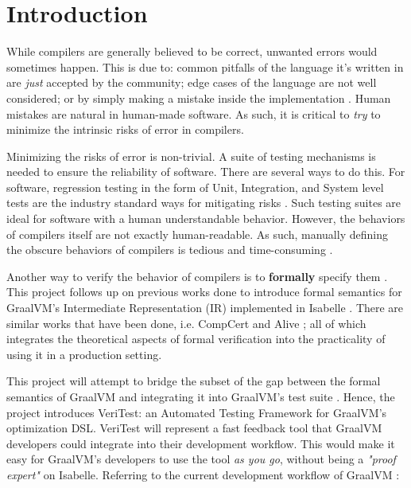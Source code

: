 \setcounter{page}{1}
\section{Introduction}

While compilers are generally believed to be correct, unwanted errors would sometimes happen. This is due to: common pitfalls of the 
language it's written in are \emph{just} accepted by the community; edge cases of the language are not well considered; or by simply making a 
mistake inside the implementation \cite[Sec. 1.2]{CompilerOptimization}. Human mistakes are natural in human-made software. As such, it is 
critical to \emph{try} to minimize the intrinsic risks of error in compilers.

Minimizing the risks of error is non-trivial. A suite of testing mechanisms is needed to ensure the reliability of software. 
There are several ways to do this. For software, regression testing in the form of Unit, Integration, and System level tests are the 
industry standard ways for mitigating risks \cite{testing}. Such testing suites are ideal for software with a human understandable behavior. However, 
the behaviors of compilers itself are not exactly human-readable. As such, manually defining the obscure behaviors of compilers is tedious and 
time-consuming \cite{compcertVerification}.

Another way to verify the behavior of compilers is to \textbf{formally} specify them \cite{compcertVerification}. This project follows up on 
previous works done to introduce formal semantics for GraalVM's \cite{graal} Intermediate Representation (IR)
\cite{ATVA21_GraalVM_IR_Semantics, Term_Graph_Optimizations} implemented in Isabelle \cite{IsabelleHOL}. There are similar works that have been 
done, i.e. CompCert \cite{compcertVerification} and Alive \cite{AliveInLean,Alive2}; all of which integrates the theoretical aspects of formal 
verification into the practicality of using it in a production setting.

This project will attempt to bridge the subset of the gap between the formal semantics of GraalVM and integrating it into GraalVM's test suite 
\cite{Term_Graph_Optimizations}. Hence, the project introduces VeriTest: an Automated Testing Framework for GraalVM's optimization DSL. 
VeriTest will represent a fast feedback tool that GraalVM developers could integrate into their development workflow. This would make it easy for 
GraalVM's developers to use the tool \emph{as you go}, without being a \emph{"proof expert"} on Isabelle.
Referring to the current development workflow of GraalVM \cite[Sec. 5.1]{Term_Graph_Optimizations}: 

